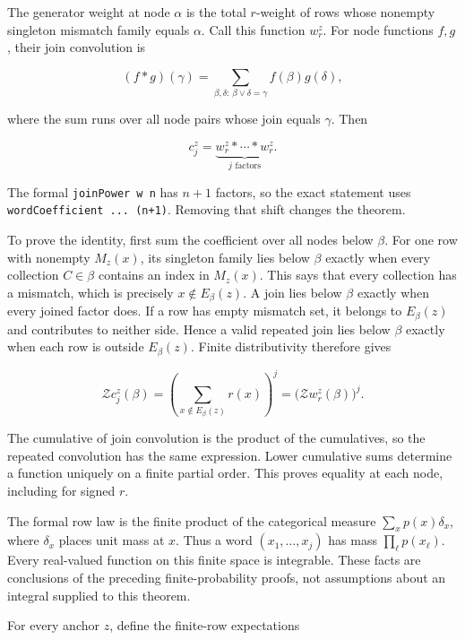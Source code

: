 The generator weight at node \(\alpha\) is the total \(r\)-weight of rows whose nonempty singleton mismatch family equals \(\alpha\). Call this function \(w_r^z\). For node functions \(f,g\), their join convolution is

\[
(f*g)(\gamma)=\sum_{\beta,\delta:\,\beta\vee\delta=\gamma}f(\beta)g(\delta),
\]

where the sum runs over all node pairs whose join equals \(\gamma\). Then

\[
c_j^z=\underbrace{w_r^z*\cdots*w_r^z}_{j\text{ factors}}.
\]

The formal \texttt{joinPower\ w\ n} has \(n+1\) factors, so the exact statement uses \texttt{wordCoefficient\ ...\ (n+1)}. Removing that shift changes the theorem.

To prove the identity, first sum the coefficient over all nodes below \(\beta\). For one row with nonempty \(M_z(x)\), its singleton family lies below \(\beta\) exactly when every collection \(C\in\beta\) contains an index in \(M_z(x)\). This says that every collection has a mismatch, which is precisely \(x\notin E_\beta(z)\). A join lies below \(\beta\) exactly when every joined factor does. If a row has empty mismatch set, it belongs to \(E_\beta(z)\) and contributes to neither side. Hence a valid repeated join lies below \(\beta\) exactly when each row is outside \(E_\beta(z)\). Finite distributivity therefore gives

\[
\mathcal Zc_j^z(\beta)
=\left(\sum_{x\notin E_\beta(z)}r(x)\right)^j
=\bigl(\mathcal Zw_r^z(\beta)\bigr)^j.
\]

The cumulative of join convolution is the product of the cumulatives, so the repeated convolution has the same expression. Lower cumulative sums determine a function uniquely on a finite partial order. This proves equality at each node, including for signed \(r\).

\label{expectations-under-the-actual-row-law}

The formal row law is the finite product of the categorical measure \(\sum_xp(x)\delta_x\), where \(\delta_x\) places unit mass at \(x\). Thus a word \((x_1,\ldots,x_j)\) has mass \(\prod_\ell p(x_\ell)\). Every real-valued function on this finite space is integrable. These facts are conclusions of the preceding finite-probability proofs, not assumptions about an integral supplied to this theorem.

For every anchor \(z\), define the finite-row expectations

